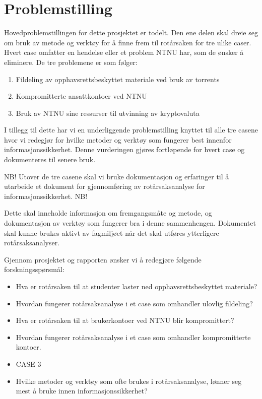 \section{Problemstilling}
\label{sec:problemstilling}
Hovedproblemstillingen for dette prosjektet er todelt. Den ene delen skal dreie seg om bruk av metode og verktøy for å finne frem til rotårsaken for tre ulike caser. Hvert case omfatter en hendelse eller et problem NTNU har, som de ønsker å eliminere. De tre problemene er som følger: 

\begin{enumerate}
    \item Fildeling av opphavsrettsbeskyttet materiale ved bruk av torrents
    \item Kompromitterte ansattkontoer ved NTNU
    \item Bruk av NTNU sine ressurser til utvinning av kryptovaluta 
\end{enumerate}

I tillegg til dette har vi en underliggende problemstilling knyttet til alle tre casene hvor vi redegjør for hvilke metoder og verktøy som fungerer best innenfor informasjonssikkerhet. Denne vurderingen gjøres fortløpende for hvert case og dokumenteres til senere bruk.

NB! Utover de tre casene skal vi bruke dokumentasjon og erfaringer til å utarbeide et dokument for gjennomføring av rotårsaksanalyse for informasjonssikkerhet. NB! 

Dette skal inneholde informasjon om fremgangsmåte og metode, og dokumentasjon av verktøy som fungerer bra i denne sammenhengen. Dokumentet skal kunne brukes aktivt av fagmiljøet når det skal utføres ytterligere rotårsaksanalyser.

Gjennom prosjektet og rapporten ønsker vi å redegjøre følgende forskningsspørsmål:

\begin{itemize}
    \item Hva er rotårsaken til at studenter laster ned opphavsrettsbeskyttet materiale?
    \item Hvordan fungerer rotårsaksanalyse i et case som omhandler ulovlig fildeling?
    \item Hva er rotårsaken til at brukerkontoer ved NTNU blir kompromittert?
    \item Hvordan fungerer rotårsaksanalyse i et case som omhandler kompromitterte kontoer. 
    \item CASE 3
    \item Hvilke metoder og verktøy som ofte brukes i rotårsaksanalyse, lønner seg mest å bruke innen informasjonssikkerhet?
\end{itemize}